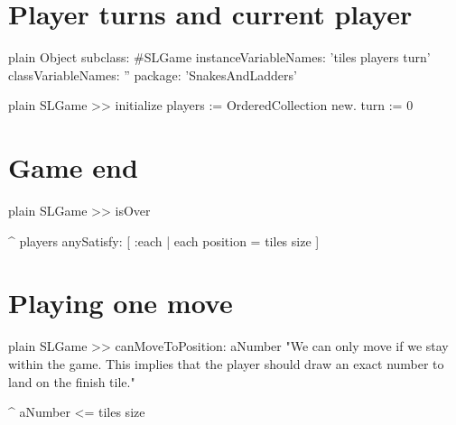 \documentclass[10pt,twoside,english]{_support/latex/sbabook/sbabook}
\begin{document}
\section{Player turns and current player}
\begin{displaycode}{plain}
Object subclass: #SLGame
	instanceVariableNames: 'tiles players turn'
	classVariableNames: ''
	package: 'SnakesAndLadders'
\end{displaycode}

\begin{displaycode}{plain}
SLGame >> initialize
	players := OrderedCollection new. 
	turn := 0
\end{displaycode}
\section{Game end}
\begin{displaycode}{plain}
SLGame >> isOver

	^ players anySatisfy: [ :each | each position = tiles size ]
\end{displaycode}
\section{Playing one move}
\begin{displaycode}{plain}
SLGame >> canMoveToPosition: aNumber
	"We can only move if we stay within the game.
	This implies that the player should draw an exact number to land on the finish tile."
	
	^ aNumber <= tiles size
\end{displaycode}


\backmatter



\end{document}
